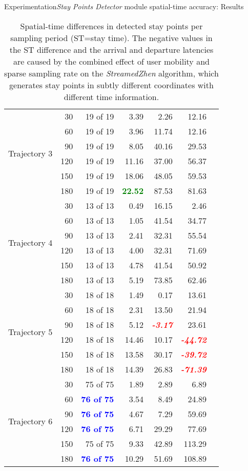 \begin{frame}[noframenumbering]{Experimentation}{\emph{Stay Points Detector} module spatial-time accuracy: Results}
\begin{table}
{\begin{tabular}{@{}lrrrrrr@{}}
\multirow{6}{*}{Trajectory 3} 
 & 30 & 19 of 19 & 3.39 &  2.26 & 12.16 \\
 & 60 & 19 of 19 & 3.96 &  11.74 & 12.16 \\
 & 90 & 19 of 19 & 8.05 &  40.16 & 29.53 \\
 & 120 & 19 of 19 & 11.16  & 37.00 & 56.37 \\
 & 150 & 19 of 19 & 18.06  & 48.05 & 59.53 \\
 & 180 & 19 of 19 & \textcolor{green}{\textbf{22.52}} & 87.53 & 81.63 \\
 \cmidrule(l){1-6}

\multirow{6}{*}{Trajectory 4} 
 & 30 & 13 of 13 & 0.49 &  16.15 & 2.46 \\
 & 60 & 13 of 13 & 1.05 &  41.54 & 34.77 \\
 & 90 & 13 of 13 & 2.41 &  32.31 & 55.54 \\
 & 120 & 13 of 13 & 4.00 & 32.31 & 71.69 \\
 & 150 & 13 of 13 & 4.78 & 41.54 & 50.92 \\
 & 180 & 13 of 13 & 5.19 & 73.85 & 62.46 \\
 \cmidrule(l){1-6}

\multirow{6}{*}{Trajectory 5} 
 & 30 & 18 of 18 & 1.49 & 0.17 & 13.61 \\
 & 60 & 18 of 18 & 2.31 & 13.50 & 21.94 \\
 & 90 & 18 of 18 & 5.12 & \textcolor{red}{\textbf{\emph{-3.17}}} & 23.61 \\
 & 120 & 18 of 18 & 14.46 & 10.17 & \textcolor{red}{\textbf{\emph{-44.72}}} \\
 & 150 & 18 of 18 & 13.58 & 30.17 & \textcolor{red}{\textbf{\emph{-39.72}}} \\
 & 180 & 18 of 18 & 14.39 & 26.83 & \textcolor{red}{\textbf{\emph{-71.39}}} \\
 \cmidrule(l){1-6}

\multirow{6}{*}{Trajectory 6} 
 & 30 & 75 of 75 & 1.89 & 2.89 & 6.89 \\
 & 60 & \textcolor{blue}{\textbf{76 of 75}} & 3.54 & 8.49 & 24.89 \\
 & 90 & \textcolor{blue}{\textbf{76 of 75}} & 4.67  & 7.29 & 59.69 \\
 & 120 & \textcolor{blue}{\textbf{76 of 75}} & 6.71 & 29.29 & 77.69 \\
 & 150 & 75 of 75 & 9.33 & 42.89 & 113.29 \\
 & 180 & \textcolor{blue}{\textbf{76 of 75}} & 10.29 & 51.69 & 108.89 \\
 \bottomrule 
\end{tabular}
}
\caption{Spatial-time differences in detected stay points per sampling period (ST=stay time). The negative values in the ST difference and the arrival and departure latencies are caused by the combined effect of user mobility and sparse sampling rate on the \emph{StreamedZhen} algorithm, which generates stay points in subtly different coordinates with different time information.}
\end{table}
\end{frame}




